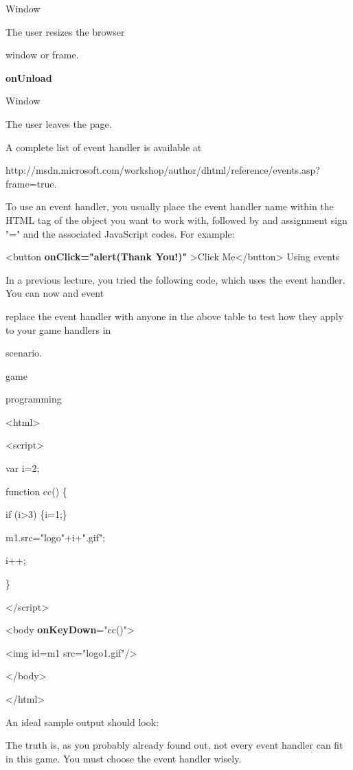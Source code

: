 \documentclass[
]{article}
\begin{document}
Window

The user resizes the browser

window or frame.

\textbf{onUnload}

Window

The user leaves the page.

A complete list of event handler is available at

http://msdn.microsoft.com/workshop/author/dhtml/reference/events.asp?frame=true.

To use an event handler, you usually place the event handler name within
the HTML tag of the object you want to work with, followed by and
assignment sign "=" and the associated JavaScript codes. For example:

\textless button \textbf{onClick="alert(\textquotesingle Thank
You!\textquotesingle)"} \textgreater Click
Me\textless/button\textgreater{} Using events

In a previous lecture, you tried the following code, which uses the
event handler. You can now and event

replace the event handler with anyone in the above table to test how
they apply to your game handlers in

scenario.

game

programming

\textless html\textgreater{}

\textbf{}

\textless script\textgreater{}

var i=2;

function cc() \{

if (i\textgreater3) \{i=1;\}

m1.src="logo"+i+".gif";

i++;

\}

\textless/script\textgreater{}

\textless body \textbf{onKeyDown}="cc()"\textgreater{}

\textless img id=m1 src="logo1.gif"/\textgreater{}

\textless/body\textgreater{}

\textless/html\textgreater{}

An ideal sample output should look:

\textbf{}

\textbf{}

The truth is, as you probably already found out, not every event handler
can fit in this game. You must choose the event handler wisely.
\end{document}
